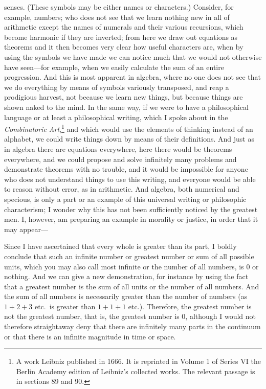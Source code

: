 \documentclass[twoside,openright]{article}
\begin{document}
senses. (These symbols may be either names or characters.) Consider, for
example, numbers; who does not see that we learn nothing new in all of
arithmetic except the names of numerals and their various recursions, which
become harmonic if they are inverted; from here we draw out equations as
theorems and it then becomes very clear how useful characters are, when by
using the symbols we have made we can notice much that we would not otherwise
have seen---for example, when we easily calculate the sum of an entire
progression.  And this is most apparent in algebra, where no one does not see
that we do everything by means of symbols variously transposed, and reap a
prodigious harvest, not because we learn new things, but because things are
shown naked to the mind.  In the same way, if we were to have a philosophical
language or at least a philosophical writing, which I spoke about in the {\em
Combinatoric Art},\footnote{A work Leibniz published in 1666.  It is reprinted in Volume 1 of Series VI the Berlin Academy edition of Leibniz's collected works.  The relevant passage is in sections 89 and 90. } and which would use the
elements of thinking instead of an alphabet, we could write things down by
means of their definitions.  And just as in algebra there are equations
everywhere, here there would be theorems everywhere, and we could propose and
solve infinitely many problems and demonstrate theorems with no trouble, and
it would be impossible for anyone who does not understand things to use this
writing, and everyone would be able to reason without error, as in arithmetic.
And algebra, both numerical and specious, is only a part or an example of this
universal writing or philosophic characterism; I wonder why this has not been
sufficiently noticed by the greatest men.  I, however, am preparing an example
in morality or justice, in order that it may appear---


Since I have ascertained that every whole is greater than its part, I boldly
conclude that such an infinite number or greatest number or sum of all
possible units, which you may also call most infinite or the number of all
numbers, is 0 or nothing.  And we can give a new demonstration, for instance
by using the fact that a greatest number is the sum of all units or the number
of all numbers.  And the sum of all numbers is necessarily greater than the
number of numbers (as $1+2+3$ etc.\ is greater than $1+1+1$ etc.).  Therefore,
the greatest number is not the greatest number, that is, the greatest number
is 0, although I would not therefore straightaway deny that there are
infinitely many parts in the continuum or that there is an infinite magnitude
in time or space.
\end{document}
